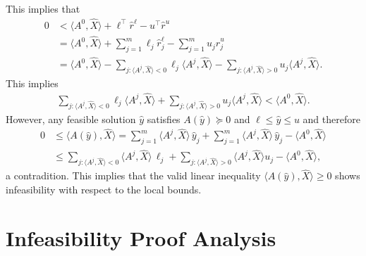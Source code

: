\documentclass[10pt, a4paper]{article}
\newcommand{\skal}[2]{\langle{#1},{#2}\rangle}
\newcommand{\T}{^{\top}}
\begin{document}
This implies that
\begin{align*}
  0 & < \skal{A^0}{\hat{X}} + \ell\T \hat{r}^\ell - u\T \hat{r}^u\\
  & = \skal{A^0}{\hat{X}} + \sum_{j=1}^m \ell_j \hat{r}^\ell_j -
    \sum_{j=1}^m u_j \hat{r}^u_j\\
  & = \skal{A^0}{\hat{X}} - \sum_{j: \skal{A^j}{\hat{X}} < 0} \ell_j \skal{A^j}{\hat{X}} -
    \sum_{j: \skal{A^j}{\hat{X}} > 0} u_j \skal{A^j}{\hat{X}}.
\end{align*}
This implies
\begin{align*}
  \sum_{j: \skal{A^j}{\hat{X}} < 0} \ell_j \skal{A^j}{\hat{X}} +
    \sum_{j: \skal{A^j}{\hat{X}} > 0} u_j \skal{A^j}{\hat{X}} < \skal{A^0}{\hat{X}}.
\end{align*}
However, any feasible solution $\hat{y}$ satisfies $A(\hat{y}) \succeq 0$ and $\ell
\leq \hat{y} \leq u$ and therefore
\begin{align*}
  0 & \leq \skal{A(\hat{y})}{\hat{X}} =
      \sum_{j=1}^m \skal{A^j}{\hat{X}}\, \hat{y}_j + \sum_{j=1}^m
      \skal{A^j}{\hat{X}}\, \hat{y}_j - \skal{A^0}{\hat{X}}\\
    & \leq \sum_{j: \skal{A^j}{\hat{X}} < 0} \skal{A^j}{\hat{X}}\, \ell_j +
    \sum_{j: \skal{A^j}{\hat{X}} > 0} \skal{A^j}{\hat{X}} u_j -
      \skal{A^0}{\hat{X}},
\end{align*}
a contradition. This implies that the valid linear inequality
$\skal{A(\hat{y})}{\hat{X}} \geq 0$ shows infeasibility with respect to the
local bounds.


\section{Infeasibility Proof Analysis}
\end{document}
